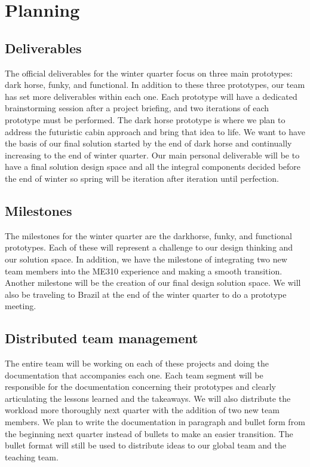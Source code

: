 \chapter{Planning}
\label{project-planning}
\section{Deliverables}
The official deliverables for the winter quarter focus on three main prototypes: dark horse, funky, and functional.  In addition to these three prototypes, our team has set more deliverables within each one.  Each prototype will have a dedicated brainstorming session after a project briefing, and two iterations of each prototype must be performed. The dark horse prototype is where we plan to address the futuristic cabin approach and bring that idea to life.  We want to have the basis of our final solution started by the end of dark horse and continually increasing to the end of winter quarter.  Our main personal deliverable will be to have a final solution design space and all the integral components decided before the end of winter so spring will be iteration after iteration until perfection. 

\section{Milestones}
The milestones for the winter quarter are the darkhorse, funky, and functional prototypes.  Each of these will represent a challenge to our design thinking and our solution space.  In addition, we have the milestone of integrating two new team members into the ME310 experience and making a smooth transition.  Another milestone will be the creation of our final design solution space.  We will also be traveling to Brazil at the end of the winter quarter to do a prototype meeting. 

\section{Distributed team management}
The entire team will be working on each of these projects and doing the documentation that accompanies each one.  Each team segment will be responsible for the documentation concerning their prototypes and clearly articulating the lessons learned and the takeaways. We will also distribute the workload more thoroughly next quarter with the addition of two new team members.  We plan to write the documentation in paragraph and bullet form from the beginning next quarter instead of bullets to make an easier transition.  The bullet format will still be used to distribute ideas to our global team and the teaching team.  


